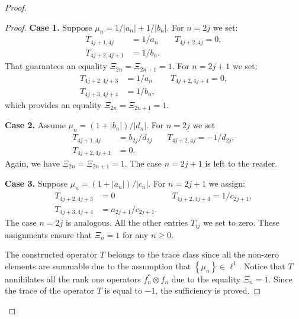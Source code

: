 \begin{proof}
\begin{proof}
        \noindent\textbf{Case 1.}
        Suppose $\mu_n = 1/|a_n| + 1/|b_n|$.
        For $n=2j$ we set:
        \begin{align*}
          T_{4j+1,4j}&=1/a_n & \quad T_{4j+2,4j} = 0,\\
          T_{4j+2,4j+1}&=1/b_n.
        \end{align*}
        That guarantees an equality $\Xi_{2n} = \Xi_{2n+1} = 1$.
        For $n=2j+1$ we set:
        \begin{align*}
          T_{4j+2,4j+3}&=1/a_n & \quad T_{4j+2,4j+4} = 0,\\
          T_{4j+3,4j+4}&=1/b_n,
        \end{align*}
        which provides an equality $\Xi_{2n} = \Xi_{2n+1} = 1$.

        \noindent\textbf{Case 2.}
        Assume $\mu_n = (1 + |b_n|)/|d_n|$. 
        For $n=2j$ we set
        \begin{align*}
          T_{4j+1,4j} &= b_{2j}/d_{2j} & \quad T_{4j+2,4j} = -1/d_{2j},\\
          T_{4j+2,4j+1} &= 0.
        \end{align*}
        Again, we have $\Xi_{2n} = \Xi_{2n+1} = 1$.
        The case $n = 2j + 1$ is left to the reader.

        \noindent\textbf{Case 3.}
        Suppose $\mu_n = (1 + |a_n|)/|c_n|$. 
        For $n = 2j + 1$ we assign:
        \begin{align*}
          T_{4j+2,4j+3} &= 0 & \quad T_{4j+2,4j+4} = 1/c_{2j+1},\\
          T_{4j+3,4j+4} &= a_{2j+1}/c_{2j+1}.
        \end{align*}
        The case $n = 2j$ is analogous.
        \medskip
        All the other entries $T_{ij}$ we set to zero.
        These assignments ensure that $\Xi_n = 1$ for any $n \geq 0$.

        The constructed operator $T$ belongs to the trace class since all the non-zero elements are summable 
          due to the assumption that $\left\{\mu_n\right\} \in \ell^1$.
        Notice that $T$ annihilates all the rank one operators $f^*_n \otimes f_n$ due to the equality $\Xi_n = 1$.
        Since the trace of the operator $T$ is equal to $-1$, the sufficiency is proved.


\end{proof}
\end{proof}
